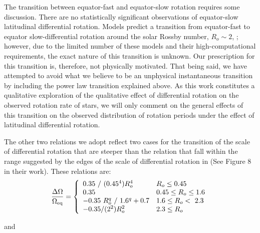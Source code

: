 The transition between equator-fast and equator-slow rotation requires some discussion.
There are no statistically significant observations of equator-slow latitudinal differential rotation.
Models predict a transition from equator-fast to equator slow-differential rotation around the solar Rossby number, $R_o \sim 2$, \citep{brun_powering_2022}; however, due to the limited number of these models and their high-computational requirements, the exact nature of this transition is unknown.
Our prescription for this transition is, therefore, not physically motivated.
That being said, we have attempted to avoid what we believe to be an unphysical instantaneous transition by including the power law transition explained above.
As this work constitutes a qualitative exploration of the qualitative effect of differential rotation on the observed rotation rate of stars, we will only comment on the general effects of this transition on the observed distribution of rotation periods under the effect of latitudinal differential rotation.

The other two relations we adopt reflect two cases for the transition of the scale of differential rotation that are steeper than the \citet{saar_starspots_2011} relation that fall within the range suggested by the edges of the scale of differential rotation in \citet{brun_powering_2022} (See Figure 8 in their work).
These relations are:
\begin{equation}
\label{eq:rot_pow4}
{\centering
\frac{\Delta\Omega}{\Omega_{\rm{eq}}} = \left\{
\begin{array}{ll}
  0.35 \ / \ (0.45^4) R_o^4& R_o\leq 0.45 \\
  0.35 & 0.45\leq R_o\leq 1.6 \\
  -0.35 \ R_o^q  \ / \ 1.6^q + 0.7 & 1.6 \leq R_o < \ 2.3\\
  -0.35/(2^2) R_o^2& 2.3\leq R_o \\
\end{array} 
\right.}
\end{equation}

and

